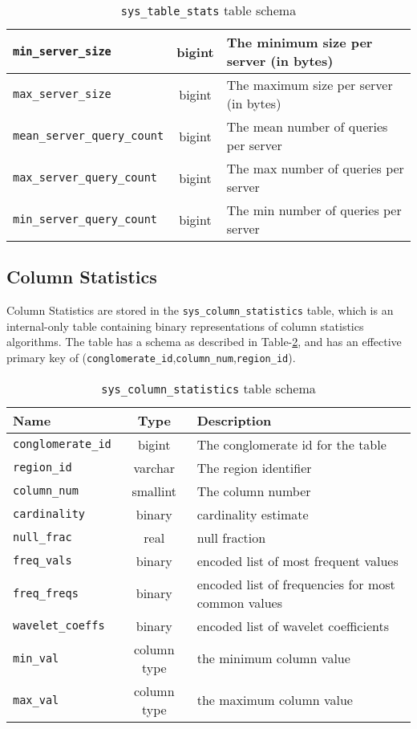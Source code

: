 \begin{table}
\begin{tabular}{|l|c|p{6cm}|}
								\texttt{min\_server\_size}					&	bigint		&	The minimum size per server (in bytes) \\ \hline
								\texttt{max\_server\_size}					&	bigint		&	The maximum size per server (in bytes) \\ \hline
								\texttt{mean\_server\_query\_count}	&	bigint		&	The mean number of queries per server  \\ \hline
								\texttt{max\_server\_query\_count}	&	bigint		&	The max number of queries per server \\ \hline
								\texttt{min\_server\_query\_count}	&	bigint		&	The min number of queries per server \\ \hline
				\end{tabular}
				\caption{\texttt{sys\_table\_stats} table schema}
				\label{table:tableStats}
\end{table}
\subsection{Column Statistics}
Column Statistics are stored in the \texttt{sys\_column\_statistics} table, which is an internal-only table containing binary representations of column statistics algorithms. The table has a schema as described in Table-\ref{table:columnStatistics}, and has an effective primary key of 
\linebreak(\texttt{conglomerate\_id},\texttt{column\_num},\texttt{region\_id}).

\begin{table}
				\begin{tabular}{|l|c|p{6cm}|}
								\hline
								\bf{Name}									& \bf{Type}	&	\bf{Description} \\ \hline	
								\texttt{conglomerate\_id}	&	bigint		&	The conglomerate id for the table \\ \hline
								\texttt{region\_id}				&	varchar		&	The region identifier \\ \hline
								\texttt{column\_num}			&	smallint	& The column number \\ \hline
								\texttt{cardinality}			&	binary		&	cardinality estimate \\ \hline
								\texttt{null\_frac}				&	real			&	null fraction \\ \hline
								\texttt{freq\_vals}				&	binary		&	encoded list of most frequent values \\ \hline
								\texttt{freq\_freqs}			&	binary		&	encoded list of frequencies for most common values \\ \hline
								\texttt{wavelet\_coeffs}	&	binary		&	encoded list of wavelet coefficients \\ \hline
								\texttt{min\_val}					&	column type	&	the minimum column value	\\	\hline
								\texttt{max\_val}					&	column type	&	the maximum column value	\\	\hline
				\end{tabular}
				\caption{\texttt{sys\_column\_statistics} table schema}
				\label{table:columnStatistics}
\end{table}

